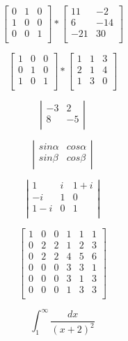 \documentclass[12pt, letterpaper, titlepage]{article}
\begin{document}
$$ \left[\begin{array}{ccc}
0&1&0\\
1&0&0\\
0&0&1\\
\end{array}\right]
*
\left[\begin{array}{cc}
11&-2 \\
6&-14\\
-21&30\\
\end{array}\right]
$$

$$ \left[\begin{array}{ccc}
1&0&0\\
0&1&0\\
1&0&1\\
\end{array}\right]
*
\left[\begin{array}{ccc}
1&1&3 \\
2&1&4\\
1&3&0\\
\end{array}\right]
$$

$$
\left|
\begin{array}{rr}
-3&2\\
8&-5\\
\end{array}
\right|
$$

$$
\left|
\begin{array}{rr}
sin \alpha&cos \alpha\\
sin \beta & cos \beta\\
\end{array}
\right|
$$

$$
\left|
\begin{array}{ccc}
1&i&1+i\\
-i&1&0\\
1-i&0&1\\
\end{array}
\right|
$$

$$ \left[\begin{array}{c|cc|ccc}
1&0&0&1&1&1\\
\hline
0&2&2&1&2&3\\
0&2&2&4&5&6\\
\hline
0&0&0&3&3&1\\
0&0&0&3&1&3\\
0&0&0&1&3&3\\
\end{array}\right]
$$

$$
\int_1^\infty \frac{dx}{(x+2)^2}
$$
\end{document}
